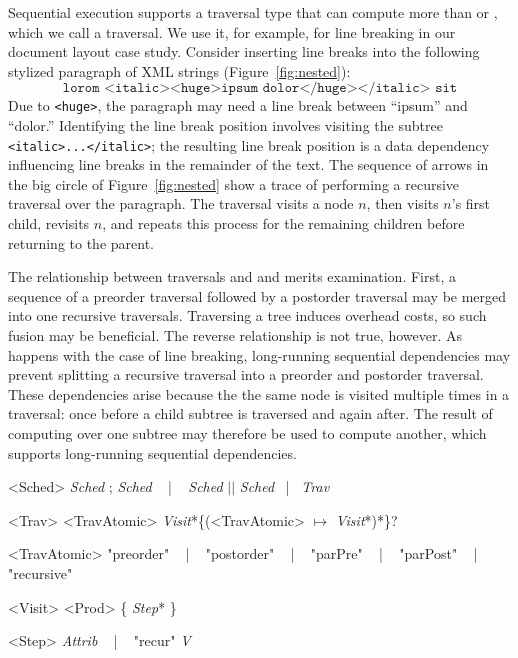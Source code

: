 Sequential execution supports a traversal type that can compute more than  or , which we call a  traversal. We use it, for example, for line breaking in our document layout case study. Consider inserting line breaks into the following stylized paragraph of XML strings (Figure~\ref{fig:nested}):
%
$$\texttt{lorom <italic><huge>ipsum dolor</huge></italic> sit}$$
%
Due to \texttt{<huge>}, the paragraph may need a line break between ``ipsum'' and ``dolor.''  Identifying the line break position involves visiting the subtree  \texttt{<italic>...</italic>}; the resulting line break position is a data dependency influencing line breaks in the remainder of the text. The sequence of arrows in the big circle of Figure~\ref{fig:nested} show a trace of performing a recursive traversal over the paragraph. The traversal visits a node $n$, then visits $n$'s first child, revisits $n$, and repeats this process for the remaining children before returning to the parent. 

The relationship between  traversals and  and  merits examination. First, a sequence of a preorder traversal followed by a postorder traversal may be merged into one recursive traversals. Traversing a tree induces overhead costs, so such fusion may be beneficial. The reverse  relationship is not true, however. As happens with the case of line breaking, long-running sequential dependencies may prevent splitting a recursive traversal into a preorder and postorder traversal. These dependencies arise because the the same node is visited multiple times in a traversal: once before a child subtree is traversed and again after. The result of computing over one subtree may therefore be used to compute another, which supports long-running sequential dependencies. 


\newsavebox{\decomplang}
\begin{lrbox}{\decomplang}%
\begin{minipage}{1\columnwidth}
\renewcommand{\litleft}{\bfseries}
\renewcommand{\ulitleft}{\bfseries}
\renewcommand{\superscript}[1]{\ensuremath{^{\textrm{#1}}}}
\renewcommand{\subscript}[1]{\ensuremath{_{\textrm{\uppercase{#1}}}}}
\renewcommand{\syntleft}{\normalfont\itshape}
\renewcommand{\syntright}{}
\begin{grammar}
<Sched> \deriv{} \emph{Sched} ; \emph{Sched}  ~ | ~ \emph{Sched} $\vert\vert$ \emph{Sched}  ~|~ \emph{Trav}

<Trav> \deriv{} <TravAtomic> \emph{Visit}*\{(<TravAtomic> $\mapsto$ \emph{Visit}*)*\}?

<TravAtomic>  \deriv{} "preorder" ~ | ~ "postorder" ~ | ~ "parPre"  ~ | ~  "parPost"  ~ | ~  "recursive" ~ 

<Visit> \deriv{} <Prod>  \{ \emph{Step}* \}

<Step> \deriv{} \emph{Attrib} ~ | ~ "recur" \emph{V} 
\end{grammar}
\end{minipage}
\end{lrbox}


